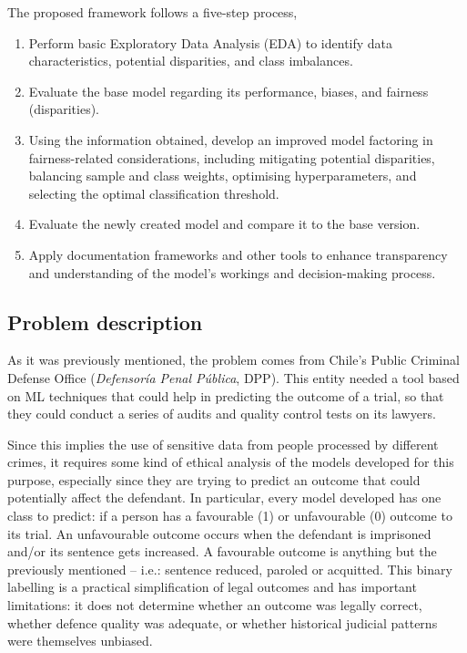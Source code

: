 \documentclass[fleqn,10pt]{wlscirep}
\begin{document}
The proposed framework follows a five-step process,

\begin{enumerate}
    \item Perform basic Exploratory Data Analysis (EDA) to identify data characteristics, potential disparities, and class imbalances.
    \item Evaluate the base model regarding its performance, biases, and fairness (disparities).
    \item Using the information obtained, develop an improved model factoring in fairness-related considerations, including mitigating potential disparities, balancing sample and class weights, optimising hyperparameters, and selecting the optimal classification threshold.
    \item Evaluate the newly created model and compare it to the base version.
    \item Apply documentation frameworks and other tools to enhance transparency and understanding of the model's workings and decision-making process.
\end{enumerate}

\subsection{Problem description}

As it was previously mentioned, the problem comes from Chile's Public Criminal Defense Office (\textit{Defensoría Penal Pública}, DPP). This entity needed a tool based on ML techniques that could help in predicting the outcome of a trial, so that they could conduct a series of audits and quality control tests on its lawyers. 

Since this implies the use of sensitive data from people processed by different crimes, it requires some kind of ethical analysis of the models developed for this purpose, especially since they are trying to predict an outcome that could potentially affect the defendant. In particular, every model developed has one class to predict: if a person has a favourable (1) or unfavourable (0) outcome to its trial. An unfavourable outcome occurs when the defendant is imprisoned and/or its sentence gets increased. A favourable outcome is anything but the previously mentioned -- i.e.: sentence reduced, paroled or acquitted. This binary labelling is a practical simplification of legal outcomes and has important limitations: it does not determine whether an outcome was legally correct, whether defence quality was adequate, or whether historical judicial patterns were themselves unbiased.
\end{document}
